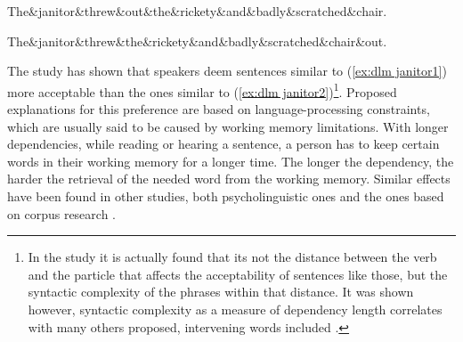 \begin{exe}
    \ex
    \label{ex:dlm janitor}
    \begin{xlist}
    \ex
    \label{ex:dlm janitor1}
    \begin{dependency}[theme = simple, segmented edge]
        \begin{deptext}
        The\&janitor\&threw\&out\&the\&rickety\&and\&badly\&scratched\&chair.\\
        \end{deptext}
    \end{dependency}

    \ex
    \label{ex:dlm janitor2}
    \begin{dependency}[theme = simple, segmented edge, edge height = 4ex]
        \begin{deptext}
        The\&janitor\&threw\&the\&rickety\&and\&badly\&scratched\&chair\&out.\\
        \end{deptext}
    \end{dependency}
    \end{xlist}
\end{exe}

The study has shown that speakers deem sentences similar to (\ref{ex:dlm janitor1}) more acceptable than the ones similar to (\ref{ex:dlm janitor2})\footnote{In the study it is actually found that its not the distance between the verb and the particle that affects the acceptability of sentences like those, but the syntactic complexity of the phrases within that distance. It was shown however, syntactic complexity as a measure of dependency length correlates with many others proposed, intervening words included \citep{wasow2002postverbal}.}. Proposed explanations for this preference are based on language-processing constraints, which are usually said to be caused by working memory limitations. With longer dependencies, while reading or hearing a sentence, a person has to keep certain words in their working memory for a longer time. The longer the dependency, the harder the retrieval of the needed word from the working memory. Similar effects have been found in other studies, both psycholinguistic ones \citep{GIBSON19981, KING1991580} and the ones based on corpus research \citep{dyer-2023, gildea-temperley-2007-optimizing, gildea-temperley-2010}. 

